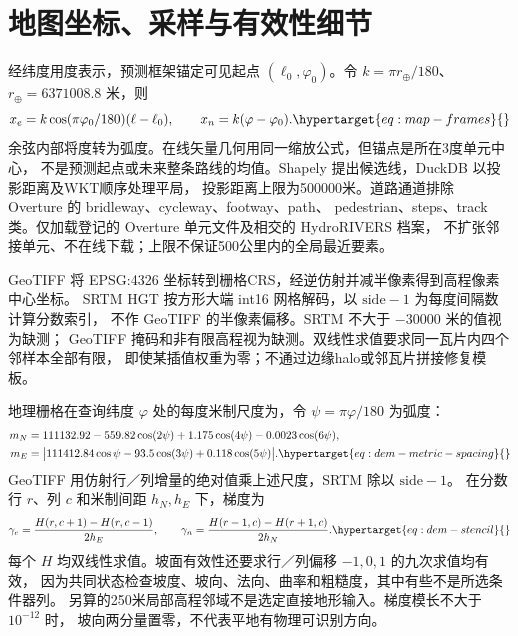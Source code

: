 \section{地图坐标、采样与有效性细节}
\label{sec:map-query-details}\hypertarget{sec:map-query-details}{}
经纬度用度表示，预测框架锚定可见起点 \((\ell_0,\varphi_0)\)。令
\(k=\pi r_\oplus/180\)、\(r_\oplus=6371008.8\) 米，则
\begin{equation}
x_e=k\cos(\pi\varphi_0/180)(\ell-\ell_0),\qquad x_n=k(\varphi-\varphi_0).
\label{eq:map-frames}\hypertarget{eq:map-frames}{}
\end{equation}
余弦内部将度转为弧度。在线矢量几何用同一缩放公式，但锚点是所在3度单元中心，
不是预测起点或未来整条路线的均值。Shapely 提出候选线，DuckDB 以投影距离及WKT顺序处理平局，
投影距离上限为500000米。道路通道排除 Overture 的 bridleway、cycleway、footway、path、
pedestrian、steps、track 类。仅加载登记的 Overture 单元文件及相交的 HydroRIVERS 档案，
不扩张邻接单元、不在线下载；上限不保证500公里内的全局最近要素。

GeoTIFF 将 EPSG:4326 坐标转到栅格CRS，经逆仿射并减半像素得到高程像素中心坐标。
SRTM HGT 按方形大端 int16 网格解码，以 \(\mathrm{side}-1\) 为每度间隔数计算分数索引，
不作 GeoTIFF 的半像素偏移。SRTM 不大于 \(-30000\) 米的值视为缺测；
GeoTIFF 掩码和非有限高程视为缺测。双线性求值要求同一瓦片内四个邻样本全部有限，
即使某插值权重为零；不通过边缘halo或邻瓦片拼接修复模板。

地理栅格在查询纬度 \(\varphi\) 处的每度米制尺度为，令 \(\psi=\pi\varphi/180\) 为弧度：
\begin{align}
m_N&=111132.92-559.82\cos(2\psi)+1.175\cos(4\psi)
      -0.0023\cos(6\psi),\nonumber\\
m_E&=\big|111412.84\cos\psi-93.5\cos(3\psi)+0.118\cos(5\psi)\big|.
\label{eq:dem-metric-spacing}\hypertarget{eq:dem-metric-spacing}{}
\end{align}
GeoTIFF 用仿射行／列增量的绝对值乘上述尺度，SRTM 除以 \(\mathrm{side}-1\)。
在分数行 \(r\)、列 \(c\) 和米制间距 \(h_N,h_E\) 下，梯度为
\begin{equation}
\gamma_e=\frac{H(r,c+1)-H(r,c-1)}{2h_E},\qquad
\gamma_n=\frac{H(r-1,c)-H(r+1,c)}{2h_N}.
\label{eq:dem-stencil}\hypertarget{eq:dem-stencil}{}
\end{equation}
每个 \(H\) 均双线性求值。坡面有效性还要求行／列偏移 \(-1,0,1\) 的九次求值均有效，
因为共同状态检查坡度、坡向、法向、曲率和粗糙度，其中有些不是所选条件器列。
另算的250米局部高程邻域不是选定直接地形输入。梯度模长不大于 \(10^{-12}\) 时，
坡向两分量置零，不代表平地有物理可识别方向。

